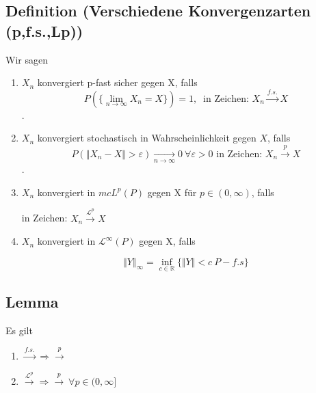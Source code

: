 \documentclass[german,10pt,oneside, fleqn, a4paper]{article}
\newcommand {\R}	{\mathbb{R}}
\newcommand {\N}	{\mathbb{N}}
\newcommand{\mc}[1]{\mathcal{#1}}
\newcommand{\1}[1]{1_{#1}}
\newcommand{\2}[1]{\1{\brac{#1}}}
\begin{document}
\subsection{Definition (Verschiedene Konvergenzarten (p,f.s.,Lp))}
Wir sagen \begin{enumerate}
\item $X_n$ konvergiert p-fast sicher gegen X, falls
\[P\left(\lbrace\lim\limits_{n\rightarrow\infty}X_n=X\rbrace\right)=1,\ \text{ in Zeichen: } X_n\xrightarrow{f.s.}X\].
\item $X_n$ konvergiert stochastisch in Wahrscheinlichkeit gegen $X$, falls \[ P\left(\Vert X_n-X\Vert >\varepsilon\right)\xrightarrow[n\rightarrow\infty]{}0\ \forall\varepsilon > 0\text{ in Zeichen: } X_n\xrightarrow{p}X\].
\item $X_n$ konvergiert in $mc{L}^p\left(P\right)$ gegen X für $p\in(0,\infty)$, falls 
in Zeichen: $X_n\xrightarrow{\mc{L}^p}X$
\item $X_n$ konvergiert in $\mc{L}^\infty\left(P\right)$ gegen X, falls 
\[\Vert Y \Vert_\infty = \inf\limits_{c\in\R}\lbrace \Vert Y \Vert < c\ P-f.s\rbrace\]
\end{enumerate}


\subsection{Lemma}






Es gilt \begin{enumerate}[label=(\alph*)]
\item $\xrightarrow{f.s.}\Rightarrow\xrightarrow{p}$
\item $\xrightarrow{\mc{L}^p}\Rightarrow\xrightarrow{p}\ \forall p\in (0,\infty]$
\end{enumerate}
\end{document}
